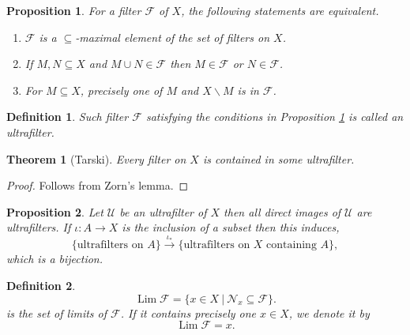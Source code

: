 \documentclass[8pt]{article}
\numberwithin{equation}{section}
\newtheorem{theorem}{Theorem} [subsection]
\newtheorem{proposition}{Proposition}[subsection]
\newtheorem{definition}{Definition}[subsection]
\newtheorem{remark}{Remark}[subsection]
\DeclareMathOperator{\Lim}{Lim}
\newcommand{\sep}[0]{\:|\:}
\begin{document}
\begin{proposition}
    \label{proposition_2_8}
    \label{fact_8}
    For a filter $\mathcal{F}$ of $X$, the following statements are equivalent.
    \begin{enumerate}[1.]
        \item $\mathcal{F}$ is a $\subseteq$-maximal element of the set of filters on $X$.
        \item If $M,N\subseteq X$ and $M\cup N\in\mathcal{F}$ then $M\in\mathcal{F}$ or $N\in\mathcal{F}$.
        \item For $M\subseteq X$, precisely one of $M$ and $X\backslash M$ is in $\mathcal{F}$.
    \end{enumerate}
\end{proposition}
\begin{definition}
    \label{definition_8}
    Such filter $\mathcal{F}$ satisfying the conditions in Proposition \ref{proposition_2_8} is called an ultrafilter.
\end{definition}
\begin{theorem}[Tarski]
    \label{theorem_tarski}
    Every filter on $X$ is contained in some ultrafilter.
\end{theorem}
\begin{proof}
    Follows from Zorn's lemma.
\end{proof}
\begin{proposition}
    \label{proposition_bijection_ultrafilters}
    Let $\mathcal{U}$ be an ultrafilter of $X$ then all direct images of $\mathcal{U}$ are ultrafilters. If $\iota:A\to X$ is the inclusion of a subset then this induces,
    \begin{equation*}
        \{\text{ultrafilters on $A$}\}\stackrel{\iota_*}{\to}\{\text{ultrafilters on $X$ containing $A$}\},
    \end{equation*}
    which is a bijection.
\end{proposition}
\begin{definition}
    \begin{equation*}
        \Lim\mathcal{F} = \{x\in X\sep \mathcal{N}_x\subseteq\mathcal{F}\}.
    \end{equation*}
    is the set of limits of $\mathcal{F}$. If it contains precisely one $x\in X$, we denote it by
    \begin{equation*}
        \Lim\mathcal{F} = x.
    \end{equation*}
\end{definition}
\end{document}
